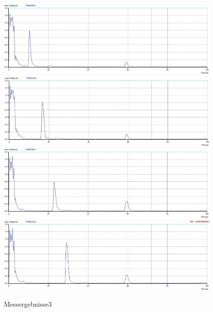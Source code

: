 \begin{figure}[H]
\centering
    
\includegraphics[width=\textwidth]{messungen/quader/bild9.jpg}
\includegraphics[width=\textwidth]{messungen/quader/10.jpg}
\includegraphics[width=\textwidth]{messungen/quader/11.jpg}
\includegraphics[width=\textwidth]{messungen/quader/12.jpg}
\caption{Messergebnisse3}	
\end{figure}
